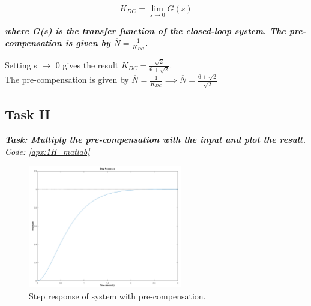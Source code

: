 \begin{equation}
    K_{DC} = \lim_{s \to 0} G(s)
\end{equation}

\textbf{\textit{where G(s) is the transfer function of the closed-loop system. The pre-compensation is given
by $\overline{N} = \frac{1}{K_{DC}}$.}}

Setting s $\to$ 0 gives the result $K_{DC} = \frac{\sqrt{2}}{6+\sqrt{2}}$.\\
The pre-compensation is given by $\overline{N} = \frac{1}{K_{DC}} \implies \overline{N} = \frac{6+\sqrt{2}}{\sqrt{2}}$

\subsection{Task H}
\textbf{\textit{Task: Multiply the pre-compensation with the input and plot the result.}}
\newline
\textit{Code: \ref{apx:1H_matlab}}

\begin{figure}[h!]
    \centering
    \includegraphics[width = 0.6\textwidth]{Images/1H_Step.png}
    \caption{Step response of system with pre-compensation.}
    \label{fig:1H_Step}
\end{figure}